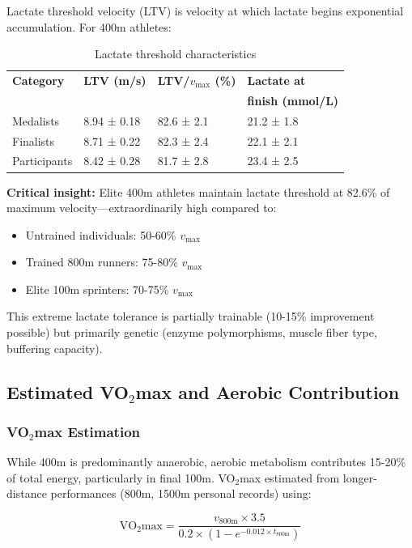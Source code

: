 Lactate threshold velocity (LTV) is velocity at which lactate begins exponential accumulation. For 400m athletes:

\begin{table}[H]
\centering
\caption{Lactate threshold characteristics}
\begin{tabular}{@{}llll@{}}
\toprule
\textbf{Category} & \textbf{LTV (m/s)} & \textbf{LTV/$v_{\max}$ (\%)} & \textbf{Lactate at} \\
 & & & \textbf{finish (mmol/L)} \\
\midrule
Medalists & 8.94 ± 0.18 & 82.6 ± 2.1 & 21.2 ± 1.8 \\
Finalists & 8.71 ± 0.22 & 82.3 ± 2.4 & 22.1 ± 2.1 \\
Participants & 8.42 ± 0.28 & 81.7 ± 2.8 & 23.4 ± 2.5 \\
\bottomrule
\end{tabular}
\end{table}

\textbf{Critical insight:} Elite 400m athletes maintain lactate threshold at 82.6\% of maximum velocity—extraordinarily high compared to:
\begin{itemize}
    \item Untrained individuals: 50-60\% $v_{\max}$
    \item Trained 800m runners: 75-80\% $v_{\max}$
    \item Elite 100m sprinters: 70-75\% $v_{\max}$
\end{itemize}

This extreme lactate tolerance is partially trainable (10-15\% improvement possible) but primarily genetic (enzyme polymorphisms, muscle fiber type, buffering capacity).

\subsection{Estimated VO$_2$max and Aerobic Contribution}

\subsubsection{VO$_2$max Estimation}

While 400m is predominantly anaerobic, aerobic metabolism contributes 15-20\% of total energy, particularly in final 100m. VO$_2$max estimated from longer-distance performances (800m, 1500m personal records) using:

\begin{equation}
\text{VO}_2\text{max} = \frac{v_{\text{800m}} \times 3.5}{0.2 \times \left(1 - e^{-0.012 \times t_{\text{800m}}}\right)}
\end{equation}

